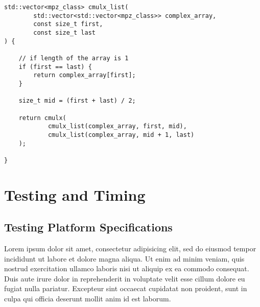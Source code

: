 \documentclass[usletter, 12pt]{article}
\begin{document}
\begin{lstlisting}
std::vector<mpz_class> cmulx_list(
        std::vector<std::vector<mpz_class>> complex_array,
        const size_t first,
        const size_t last
) {

    // if length of the array is 1
    if (first == last) {
        return complex_array[first];
    }

    size_t mid = (first + last) / 2;

    return cmulx(
            cmulx_list(complex_array, first, mid),
            cmulx_list(complex_array, mid + 1, last)
    );

}
\end{lstlisting}

        \iffalse
        \begin{figure}[ht]
            \begin{center}
                \texttt{[image: figures/state\_diagram.png]}
                \caption{State Diagram Implementation of the Game with the Secret Code Mapped to 0b00011011} \label{fig:state_diagram}
            \end{center}
        \end{figure}
        \fi

    \section{Testing and Timing}
        \subsection{Testing Platform Specifications}

        Lorem ipsum dolor sit amet, consectetur adipisicing elit, sed do eiusmod
        tempor incididunt ut labore et dolore magna aliqua. Ut enim ad minim veniam,
        quis nostrud exercitation ullamco laboris nisi ut aliquip ex ea commodo
        consequat. Duis aute irure dolor in reprehenderit in voluptate velit esse
        cillum dolore eu fugiat nulla pariatur. Excepteur sint occaecat cupidatat non
        proident, sunt in culpa qui officia deserunt mollit anim id est laborum.
\end{document}
